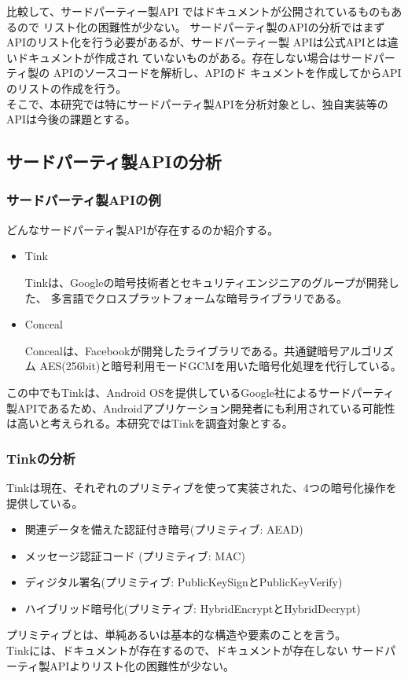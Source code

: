 比較して、サードパーティー製API
ではドキュメントが公開されているものもあるので
リスト化の困難性が少ない。
サードパーティ製のAPIの分析ではまずAPIのリスト化を行う必要があるが、サードパーティー製
APIは公式APIとは違いドキュメントが作成され
ていないものがある。存在しない場合はサードパー
ティ製の APIのソースコードを解析し、APIのド
キュメントを作成してからAPIのリストの作成を行う。
\\そこで、本研究では特にサードパーティ製APIを分析対象とし、独自実装等のAPIは今後の課題とする。

\subsection{サードパーティ製APIの分析}

\subsubsection{サードパーティ製APIの例}
どんなサードパーティ製APIが存在するのか紹介する。
\label{sec:third_party}
\begin{itemize}
\item Tink　

Tinkは、Googleの暗号技術者とセキュリティエンジニアのグループが開発した、
多言語でクロスプラットフォームな暗号ライブラリである。

\item Conceal

Concealは、Facebookが開発したライブラリである。共通鍵暗号アルゴリズム AES(256bit)と暗号利用モードGCMを用いた暗号化処理を代行している。
 
\end{itemize}
この中でもTinkは、Android OSを提供しているGoogle社によるサードパーティ製APIであるため、Androidアプリケーション開発者にも利用されている可能性は高いと考えられる。本研究ではTinkを調査対象とする。

\subsubsection{Tinkの分析}

Tinkは現在、それぞれのプリミティブを使って実装された、4つの暗号化操作を提供している。
\begin{itemize}
\item 関連データを備えた認証付き暗号(プリミティブ: AEAD)
\item メッセージ認証コード (プリミティブ: MAC)
\item ディジタル署名(プリミティブ: PublicKeySignとPublicKeyVerify)
\item ハイブリッド暗号化(プリミティブ: HybridEncryptとHybridDecrypt)
\end{itemize}
プリミティブとは、単純あるいは基本的な構造や要素のことを言う。
\\Tinkには、ドキュメントが存在するので、ドキュメントが存在しない
サードパーティ製APIよりリスト化の困難性が少ない。

